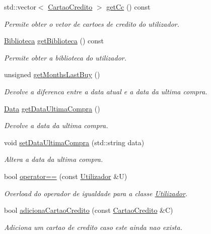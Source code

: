 \begin{DoxyCompactItemize}
std\+::vector$<$ \hyperlink{classCartaoCredito}{Cartao\+Credito} $>$ \hyperlink{classUtilizador_ad0ebe5ff80aa77145ec4b0ce5473102c}{get\+Cc} () const
\begin{DoxyCompactList}\small\item\em Permite obter o vetor de cartoes de credito do utilizador. \end{DoxyCompactList}\item 
\hyperlink{classBiblioteca}{Biblioteca} \hyperlink{classUtilizador_a6a128859b776bf019b5652ce61f62280}{get\+Biblioteca} () const
\begin{DoxyCompactList}\small\item\em Permite obter a biblioteca do utilizador. \end{DoxyCompactList}\item 
unsigned \hyperlink{classUtilizador_a8c4c3275a56142c31f19c7af78e3c88f}{get\+Months\+Last\+Buy} ()
\begin{DoxyCompactList}\small\item\em Devolve a diferenca entre a data atual e a data da ultima compra. \end{DoxyCompactList}\item 
\hyperlink{classData}{Data} \hyperlink{classUtilizador_a68fcb8d8b1ebce49da37439aaa1a7b79}{get\+Data\+Ultima\+Compra} ()
\begin{DoxyCompactList}\small\item\em Devolve a data da ultima compra. \end{DoxyCompactList}\item 
void \hyperlink{classUtilizador_ac3c7ff821739e5682a5d06d0868031ac}{set\+Data\+Ultima\+Compra} (std\+::string data)
\begin{DoxyCompactList}\small\item\em Altera a data da ultima compra. \end{DoxyCompactList}\item 
bool \hyperlink{classUtilizador_abd73f24d4eb5fa0838af819e8343b1f5}{operator==} (const \hyperlink{classUtilizador}{Utilizador} \&U)
\begin{DoxyCompactList}\small\item\em Overload do operador de igualdade para a classe \hyperlink{classUtilizador}{Utilizador}. \end{DoxyCompactList}\item 
bool \hyperlink{classUtilizador_a60b1025ffe94b9f2414f54cc94662cc9}{adiciona\+Cartao\+Credito} (const \hyperlink{classCartaoCredito}{Cartao\+Credito} \&C)
\begin{DoxyCompactList}\small\item\em Adiciona um cartao de credito caso este ainda nao exista. \end{DoxyCompactList}\item 

\end{DoxyCompactItemize}
